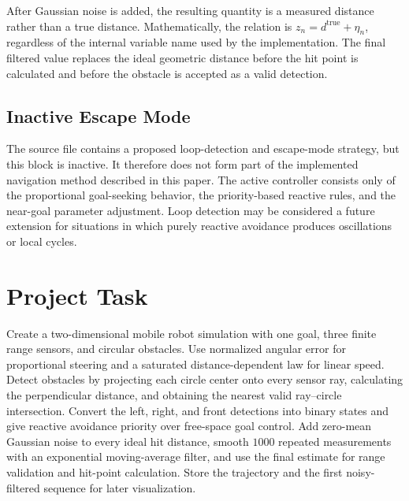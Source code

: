 \documentclass[10pt,twocolumn,a4paper]{article}
\begin{document}
After Gaussian noise is added, the resulting quantity is a measured
distance rather than a true distance. Mathematically, the relation is
$z_n=d^{\mathrm{true}}+\eta_n$, regardless of the internal variable name
used by the implementation. The final filtered value replaces the ideal
geometric distance before the hit point is calculated and before the
obstacle is accepted as a valid detection.

\subsection{Inactive Escape Mode}

The source file contains a proposed loop-detection and escape-mode
strategy, but this block is inactive. It therefore does not form part of
the implemented navigation method described in this paper. The active
controller consists only of the proportional goal-seeking behavior, the
priority-based reactive rules, and the near-goal parameter adjustment.
Loop detection may be considered a future extension for situations in
which purely reactive avoidance produces oscillations or local cycles.

\section{Project Task}

Create a two-dimensional mobile robot simulation with one goal, three
finite range sensors, and circular obstacles. Use normalized angular
error for proportional steering and a saturated distance-dependent law
for linear speed. Detect obstacles by projecting each circle center onto
every sensor ray, calculating the perpendicular distance, and obtaining
the nearest valid ray--circle intersection. Convert the left, right, and
front detections into binary states and give reactive avoidance priority
over free-space goal control. Add zero-mean Gaussian noise to every ideal
hit distance, smooth $1000$ repeated measurements with an exponential
moving-average filter, and use the final estimate for range validation
and hit-point calculation. Store the trajectory and the first
noisy-filtered sequence for later visualization.

\end{document}
